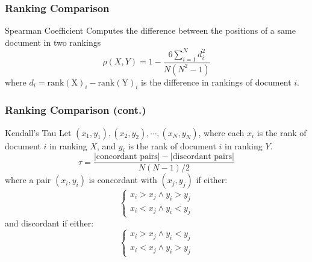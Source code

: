 \documentclass[svgnames]{beamer}
\begin{document}
\begin{frame}
    \frametitle{Ranking Comparison}
    \begin{block}{Spearman Coefficient}
        Computes the difference between the positions of a same document in two
        rankings
        \begin{displaymath}
            \rho(X,Y) = 1 - \frac{6\sum_{i=1}^N d_i^2}{N(N^2-1)}
        \end{displaymath}
        where $d_i = \operatorname{rank(X)}_i - \operatorname{rank(Y)}_i$ is
        the difference in rankings of document $i$.
    \end{block}

\end{frame}


\begin{frame}
    \frametitle{Ranking Comparison (cont.)}

    \begin{block}{Kendall's Tau}
        Let $(x_1, y_1), (x_2, y_2), \cdots, (x_N, y_N)$, where each $x_i$ is
        the rank of document $i$ in ranking $X$, and $y_i$ is the rank of
        document $i$ in ranking $Y$.
        \begin{displaymath}
            \tau = \frac{|\text{concordant pairs}| - |\text{discordant pairs}|}{N(N-1)/2}
        \end{displaymath}
        \small
        where a pair $(x_i, y_i)$ is concordant with $(x_j, y_j)$ if either:
        \begin{displaymath}
            \left\{
                  \begin{array}{l}
                    x_i > x_j \wedge y_i > y_j\\
                    x_i < x_j \wedge y_i < y_j
                  \end{array}
            \right.
        \end{displaymath}
        and discordant if either:
        \begin{displaymath}
            \left\{
                  \begin{array}{l}
                    x_i > x_j \wedge y_i < y_j\\
                    x_i < x_j \wedge y_i > y_j
                  \end{array}
            \right.
        \end{displaymath}
    \end{block}

\end{frame}
\end{document}
